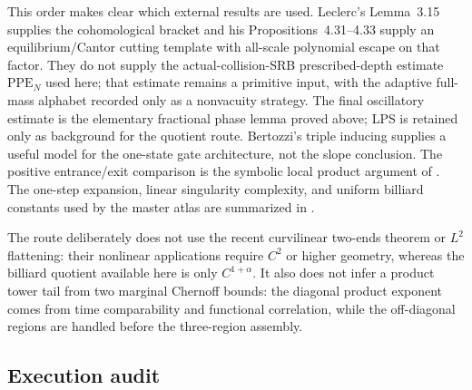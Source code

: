 \documentclass[11pt]{article}
\begin{document}
This order makes clear which external results are used.  Leclerc's
Lemma~3.15 supplies the cohomological bracket and his
Propositions~4.31--4.33 supply an equilibrium/Cantor cutting template with
all-scale polynomial escape on that factor.  They do not supply the
actual-collision-SRB prescribed-depth estimate $\mathrm{PPE}_{N}$ used here;
that estimate remains a primitive input, with the adaptive full-mass alphabet
recorded only as a nonvacuity strategy.
The final oscillatory estimate is the elementary fractional phase lemma
proved above; LPS is retained only as background for the quotient route.
Bertozzi's triple inducing supplies a useful model for the one-state gate
architecture, not the slope conclusion.  The positive entrance/exit comparison is the symbolic local
product argument of \cite{ClimenhagaLPS}.  The
one-step expansion, linear singularity complexity, and uniform billiard
constants used by the master atlas are summarized in \cite{DLreview}.

The route deliberately does not use the recent curvilinear two-ends theorem
or $L^2$ flattening: their nonlinear applications require $C^2$ or higher
geometry, whereas the billiard quotient available here is only
$C^{1+\alpha}$.  It also does not infer a product tower tail from two
marginal Chernoff bounds: the diagonal product exponent comes from time
comparability and functional correlation, while the off-diagonal regions are
handled before the three-region assembly.

\subsection{Execution audit}
\end{document}
